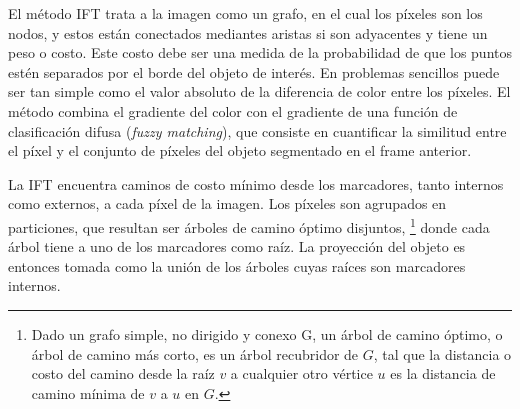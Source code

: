 \documentclass[a4paper,10pt]{article}
\begin{document}
El método IFT trata a la imagen como un grafo, en el cual los píxeles son los
nodos, y estos están conectados mediantes aristas si son adyacentes y tiene un
peso o costo. Este costo debe ser una medida de la probabilidad de que los
puntos estén separados por el borde del objeto de interés. En problemas
sencillos puede ser tan simple como el valor absoluto de la diferencia de color
entre los píxeles. El método combina el gradiente del color con el gradiente de
una función de clasificación difusa (\textit{fuzzy matching}), que consiste en
cuantificar la similitud entre el píxel y el conjunto de píxeles del objeto
segmentado en el frame anterior.

La IFT encuentra caminos de costo mínimo desde los marcadores, tanto internos
como externos, a cada píxel de la imagen. Los píxeles son agrupados en
particiones, que resultan ser árboles de camino óptimo disjuntos,
\footnote{Dado un grafo simple, no dirigido y conexo G, un árbol de camino
  óptimo, o árbol de camino más corto, es un árbol recubridor de $G$, tal que
  la distancia o costo del camino desde la raíz $v$ a cualquier otro vértice
$u$ es la distancia de camino mínima de $v$ a $u$ en $G$.} donde cada árbol
tiene a uno de los marcadores como raíz. La proyección del objeto es entonces
tomada como la unión de los árboles cuyas raíces son marcadores internos.
\end{document}
